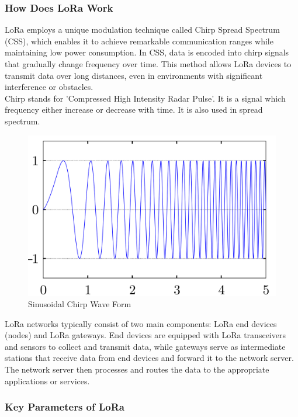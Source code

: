 \subsubsection{How Does LoRa Work}
\hspace{12pt} LoRa employs a unique modulation technique called Chirp Spread Spectrum (CSS), which enables it to achieve remarkable communication ranges while maintaining low power consumption. In CSS, data is encoded into chirp signals that gradually change frequency over time. This method allows LoRa devices to transmit data over long distances, even in environments with significant interference or obstacles.\\

Chirp stands for 'Compressed High Intensity Radar Pulse'. It is a signal which frequency either increase or decrease with time. It is also used in spread spectrum.

\begin{figure}[htp!]
    \centering
    \includegraphics[scale=0.3]{images/Screenshot 2024-04-01 190918.png}
    \caption{Sinusoidal Chirp Wave Form}
\end{figure}

LoRa networks typically consist of two main components: LoRa end devices (nodes) and LoRa gateways. End devices are equipped with LoRa transceivers and sensors to collect and transmit data, while gateways serve as intermediate stations that receive data from end devices and forward it to the network server. The network server then processes and routes the data to the appropriate applications or services.

\subsubsection{Key Parameters of LoRa}

